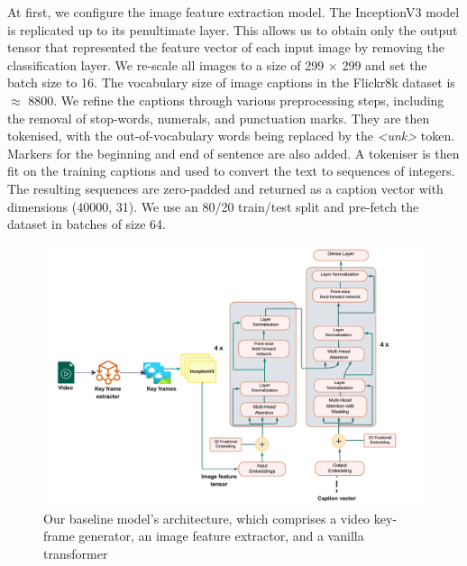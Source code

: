 At first, we configure the image feature extraction model. The InceptionV3 model is replicated up to its penultimate layer. This allows us to obtain only the output tensor that represented the feature vector of each input image by removing the classification layer. We re-scale all images to a size of 299 $\times$ 299 and set the batch size to 16. The vocabulary size of image captions in the Flickr8k dataset is $\approx$ 8800. We refine the captions through various preprocessing steps, including the removal of stop-words, numerals, and punctuation marks. They are then tokenised, with the out-of-vocabulary words being replaced by the \textit{<unk>} token. Markers for the beginning and end of sentence are also added. A tokeniser is then fit on the training captions and used to convert the text to sequences of integers. The resulting sequences are zero-padded and returned as a caption vector with dimensions (40000, 31). We use an 80/20 train/test split and pre-fetch the dataset in batches of size 64.
\begin{figure}[htbp] %
  \centering
  \includegraphics[scale=0.6]{images/baseline.pdf} %
  \caption{Our baseline model's architecture, which comprises a video key-frame generator, an image feature extractor, and a vanilla transformer}
  \label{fig:baseline}
\end{figure} 
